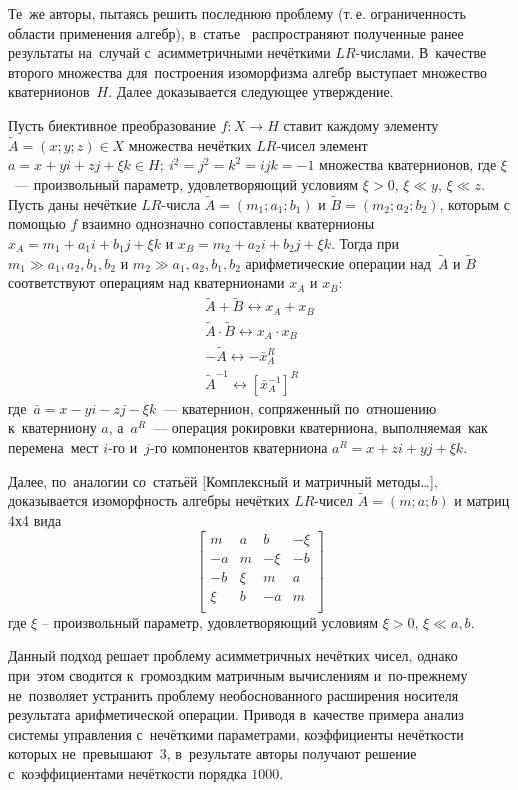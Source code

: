Те~же авторы, пытаясь решить последнюю проблему (т.\,е. ограниченность области применения алгебр), в~статье~\cite{Uskov_Quaternion} распространяют полученные ранее результаты на~случай с~асимметричными нечёткими $LR$-числами. В~качестве второго множества для~построения изоморфизма алгебр выступает множество кватернионов~$H$. Далее доказывается следующее утверждение.
\begin{theorem}
Пусть биективное преобразование $f:X\to H$ ставит каждому элементу $\tilde{A}=\left( x;y;z \right)\in X$ множества нечётких $LR$-чисел элемент $a=x+yi+zj+\xi k\in H;\ {{i}^{2}}={{j}^{2}}={{k}^{2}}=ijk=-1$ множества кватернионов, где $\xi$~--– произвольный параметр, удовлетворяющий условиям $\xi >0$, $\xi \ll y$, $\xi \ll z$. Пусть даны нечёткие $LR$-числа $\tilde{A}=\left( {{m}_{1}};{{a}_{1}};{{b}_{1}} \right)$ и $\tilde{B}=\left( {{m}_{2}};{{a}_{2}};{{b}_{2}} \right)$, которым с помощью $f$ взаимно однозначно сопоставлены кватернионы ${{x}_{A}}={{m}_{1}}+{{a}_{1}}i+{{b}_{1}}j+\xi k$ и ${{x}_{B}}={{m}_{2}}+{{a}_{2}}i+{{b}_{2}}j+\xi k$. Тогда при~${{m}_{1}}\gg {{a}_{1}},{{a}_{2}},{{b}_{1}},{{b}_{2}}$ и ${{m}_{2}}\gg {{a}_{1}},{{a}_{2}},{{b}_{1}},{{b}_{2}}$ арифметические операции над~$\tilde A$ и $\tilde B$ соответствуют операциям над кватернионами ${{x}_{A}}$ и ${{x}_{B}}$:
\begin{gather*}
  \tilde{A}+\tilde{B}\leftrightarrow {{x}_{A}}+{{x}_{B}} \\ 
  \tilde{A}\cdot \tilde{B}\leftrightarrow {{x}_{A}}\cdot {{x}_{B}} \\ 
  -\tilde{A}\leftrightarrow -\bar{x}_{A}^{R} \\ 
  {{{\tilde{A}}}^{-1}}\leftrightarrow {{\left[ \bar{x}_{A}^{-1} \right]}^{R}}
\end{gather*}
где~$\bar a=x-yi-zj-\xi k$~--- кватернион, сопряженный по~отношению к~кватерниону $a$, а~${{a}^{R}}$~–-- операция рокировки кватерниона, выполняемая~как перемена~мест $i$-го и~$j$-го компонентов кватерниона $a^R=x+zi+yj+\xi k$.
\end{theorem}

Далее, по~аналогии со~статьёй [Комплексный и матричный методы…], доказывается изоморфность алгебры нечётких $LR$-чисел $\tilde{A}=\left( m;a;b \right)$ и матриц 4х4 вида
	\[\left[ \begin{matrix}
   m & a & b & -\xi   \\
   -a & m & -\xi  & -b  \\
   -b & \xi  & m & a  \\
   \xi  & b & -a & m  \\
\end{matrix} \right]\]
где $\xi $ – произвольный параметр, удовлетворяющий условиям $\xi>0$, $\xi \ll a,b$.

Данный подход решает проблему асимметричных нечётких чисел, однако при~этом сводится к~громоздким матричным вычислениям и~по-прежнему не~позволяет устранить проблему необоснованного расширения носителя результата арифметической операции. Приводя в~качестве примера анализ системы управления с~нечёткими параметрами, коэффициенты нечёткости которых не~превышают~$3$, в~результате авторы получают решение с~коэффициентами нечёткости порядка $1000$.
